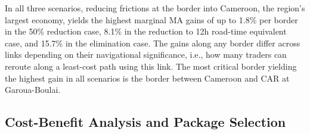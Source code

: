 \documentclass[a4paper]{article}
\begin{document}
In all three scenarios, reducing frictions at the border into Cameroon, the region's largest economy, yields the highest marginal MA gains of up to 1.8\% per border in the 50\% reduction case, 8.1\% in the reduction to 12h road-time equivalent case, and 15.7\% in the elimination case. The gains along any border differ across links depending on their navigational significance, i.e., how many traders can reroute along a least-cost path using this link. The most critical border yielding the highest gain in all scenarios is the border between Cameroon and CAR at Garoua-Boulai. 


\subsection{Cost-Benefit Analysis and Package Selection}
\end{document}
